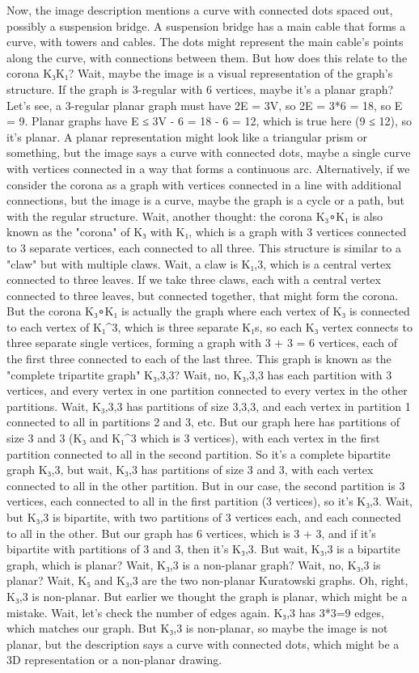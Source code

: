 Now, the image description mentions a curve with connected dots spaced out, possibly a suspension bridge. A suspension bridge has a main cable that forms a curve, with towers and cables. The dots might represent the main cable's points along the curve, with connections between them. But how does this relate to the corona K₃K₁? Wait, maybe the image is a visual representation of the graph's structure. If the graph is 3-regular with 6 vertices, maybe it's a planar graph? Let's see, a 3-regular planar graph must have 2E = 3V, so 2E = 3*6 = 18, so E = 9. Planar graphs have E ≤ 3V - 6 = 18 - 6 = 12, which is true here (9 ≤ 12), so it's planar. A planar representation might look like a triangular prism or something, but the image says a curve with connected dots, maybe a single curve with vertices connected in a way that forms a continuous arc. Alternatively, if we consider the corona as a graph with vertices connected in a line with additional connections, but the image is a curve, maybe the graph is a cycle or a path, but with the regular structure. Wait, another thought: the corona K₃∘K₁ is also known as the "corona" of K₃ with K₁, which is a graph with 3 vertices connected to 3 separate vertices, each connected to all three. This structure is similar to a "claw" but with multiple claws. Wait, a claw is K₁,3, which is a central vertex connected to three leaves. If we take three claws, each with a central vertex connected to three leaves, but connected together, that might form the corona. But the corona K₃∘K₁ is actually the graph where each vertex of K₃ is connected to each vertex of K₁^3, which is three separate K₁s, so each K₃ vertex connects to three separate single vertices, forming a graph with 3 + 3 = 6 vertices, each of the first three connected to each of the last three. This graph is known as the "complete tripartite graph" K₃,3,3? Wait, no, K₃,3,3 has each partition with 3 vertices, and every vertex in one partition connected to every vertex in the other partitions. Wait, K₃,3,3 has partitions of size 3,3,3, and each vertex in partition 1 connected to all in partitions 2 and 3, etc. But our graph here has partitions of size 3 and 3 (K₃ and K₁^3 which is 3 vertices), with each vertex in the first partition connected to all in the second partition. So it's a complete bipartite graph K₃,3, but wait, K₃,3 has partitions of size 3 and 3, with each vertex connected to all in the other partition. But in our case, the second partition is 3 vertices, each connected to all in the first partition (3 vertices), so it's K₃,3. Wait, but K₃,3 is bipartite, with two partitions of 3 vertices each, and each connected to all in the other. But our graph has 6 vertices, which is 3 + 3, and if it's bipartite with partitions of 3 and 3, then it's K₃,3. But wait, K₃,3 is a bipartite graph, which is planar? Wait, K₃,3 is a non-planar graph? Wait, no, K₃,3 is planar? Wait, K₅ and K₃,3 are the two non-planar Kuratowski graphs. Oh, right, K₃,3 is non-planar. But earlier we thought the graph is planar, which might be a mistake. Wait, let's check the number of edges again. K₃,3 has 3*3=9 edges, which matches our graph. But K₃,3 is non-planar, so maybe the image is not planar, but the description says a curve with connected dots, which might be a 3D representation or a non-planar drawing. 